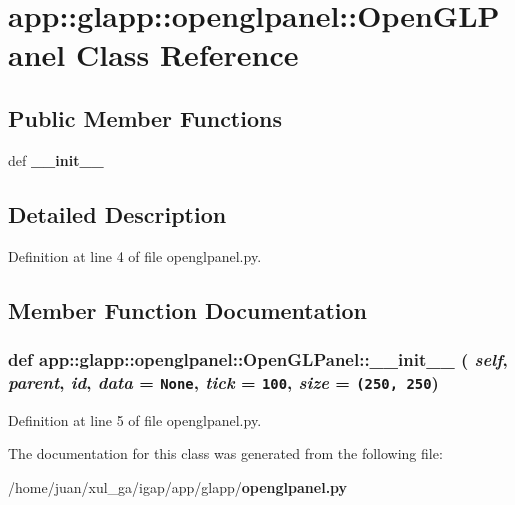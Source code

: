 \section{app::glapp::openglpanel::OpenGLPanel Class Reference}
\label{classapp_1_1glapp_1_1openglpanel_1_1OpenGLPanel}
\subsection*{Public Member Functions}
\begin{CompactItemize}
\item 
def {\bf \_\-\_\-init\_\-\_\-}
\end{CompactItemize}


\subsection{Detailed Description}


Definition at line 4 of file openglpanel.py.

\subsection{Member Function Documentation}
\subsubsection{\setlength{\rightskip}{0pt plus 5cm}def app::glapp::openglpanel::OpenGLPanel::\_\-\_\-init\_\-\_\- ( {\em self},  {\em parent},  {\em id},  {\em data} = {\tt None},  {\em tick} = {\tt 100},  {\em size} = {\tt (250,~250})}\label{classapp_1_1glapp_1_1openglpanel_1_1OpenGLPanel_f65b2b3b1999d8bfa37a34dae2980b78}




Definition at line 5 of file openglpanel.py.

The documentation for this class was generated from the following file:\begin{CompactItemize}
\item 
/home/juan/xul\_\-ga/igap/app/glapp/{\bf openglpanel.py}\end{CompactItemize}

